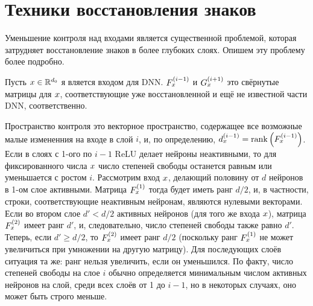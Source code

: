 
\section {Техники восстановления знаков}
Уменьшение контроля над входами является существенной проблемой, которая затрудняет восстановление знаков в более глубоких слоях. Опишем эту проблему более подробно.

Пусть $\mathnormal{x} \in \mathbb{R}^{d_{0}}$ я вляется входом для DNN. $\mathnormal{F}_{\mathnormal{x}}^{\left(i-1\right)}$ и $\mathnormal{G}_{\mathnormal{x}}^{\left(i+1\right)}$ это свёрнутые матрицы для $\mathnormal{x}$, соответствующие уже восстановленной и ещё не известной части DNN, соответственно.

Пространство контроля это векторное пространство, содержащее все возможные малые измененния на входе в слой $i$, и, по определению, $\mathnormal{d}_{\mathnormal{x}}^{\left(i-1\right)} = \mathop{\mathrm{rank}}\left(\mathnormal{F}_{\mathnormal{x}}^{\left(i-1\right)}\right)$. Если в слоях с 1-ого по $i-1$ ReLU делает нейроны неактивными, то для фиксированного числа $\mathnormal{x}$ число степеней свободы останется равным или уменьшается с ростом $i$. Рассмотрим вход $\mathnormal{x}$, делающий половину от $d$ нейронов в 1-ом слое активными. Матрица $\mathnormal{F}_{\mathnormal{x}}^{\left(1\right)}$ тогда будет иметь ранг $d/2$, и, в частности, строки, соответствующие неактивным нейронам, являются нулевыми векторами. Если во втором слое $d' < d/2$ активных нейронов (для того же входа $\mathnormal{x}$), матрица $\mathnormal{F}_{\mathnormal{x}}^{\left(2\right)}$ имеет ранг $d'$, и, следовательно, число степеней свободы также равно $d'$. Теперь, если $d' \ge d/2$, то $\mathnormal{F}_{\mathnormal{x}}^{\left(2\right)}$ имеет ранг $d/2$ (поскольку ранг $\mathnormal{F}_{\mathnormal{x}}^{\left(1\right)}$ не может увеличиться при умножении на другую матрицу). Для последующих слоёв ситуация та же: ранг нельзя увеличить, если он уменьшился. По факту, число степеней свободы на слое $i$ обычно определяется минимальным числом активных нейронов на слой, среди всех слоёв от 1 до $i-1$, но в некоторых случаях, оно может быть строго меньше.

